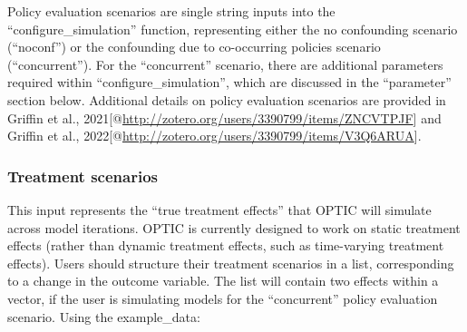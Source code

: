 \documentclass[
]{article}
\begin{document}
Policy evaluation scenarios are single string inputs into the
``configure\_simulation'' function, representing either the no
confounding scenario (``noconf'') or the confounding due to co-occurring
policies scenario (``concurrent''). For the ``concurrent'' scenario,
there are additional parameters required within
``configure\_simulation'', which are discussed in the ``parameter''
section below. Additional details on policy evaluation scenarios are
provided in Griffin et al.,
2021{[}@\url{http://zotero.org/users/3390799/items/ZNCVTPJF}{]} and
Griffin et al.,
2022{[}@\url{http://zotero.org/users/3390799/items/V3Q6ARUA}{]}.

\hypertarget{treatment-scenarios}{%
\subsubsection{Treatment scenarios}\label{treatment-scenarios}}

This input represents the ``true treatment effects'' that OPTIC will
simulate across model iterations. OPTIC is currently designed to work on
static treatment effects (rather than dynamic treatment effects, such as
time-varying treatment effects). Users should structure their treatment
scenarios in a list, corresponding to a change in the outcome variable.
The list will contain two effects within a vector, if the user is
simulating models for the ``concurrent'' policy evaluation scenario.
Using the example\_data:
\end{document}
